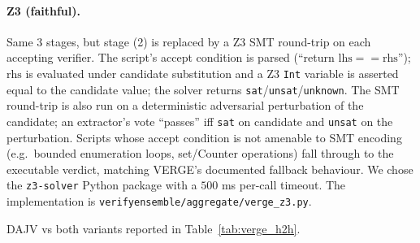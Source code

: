 \paragraph{Z3 (faithful).}
Same 3 stages, but stage (2) is replaced by a Z3 SMT round-trip on
each accepting verifier. The script's accept condition is parsed
(``return $\text{lhs} == \text{rhs}$''); $\text{rhs}$ is evaluated
under candidate substitution and a Z3 \texttt{Int} variable is
asserted equal to the candidate value; the solver returns
\texttt{sat}/\texttt{unsat}/\texttt{unknown}. The SMT round-trip is
also run on a deterministic adversarial perturbation of the
candidate; an extractor's vote ``passes'' iff
\texttt{sat} on candidate and \texttt{unsat} on the perturbation.
Scripts whose accept condition is not amenable to SMT encoding
(e.g.\ bounded enumeration loops, set/Counter operations) fall
through to the executable verdict, matching VERGE's documented
fallback behaviour. We chose the \texttt{z3-solver} Python package
with a $500$ ms per-call timeout. The implementation is
\texttt{verifyensemble/aggregate/verge\_z3.py}.

DAJV vs both variants reported in Table~\ref{tab:verge_h2h}.
